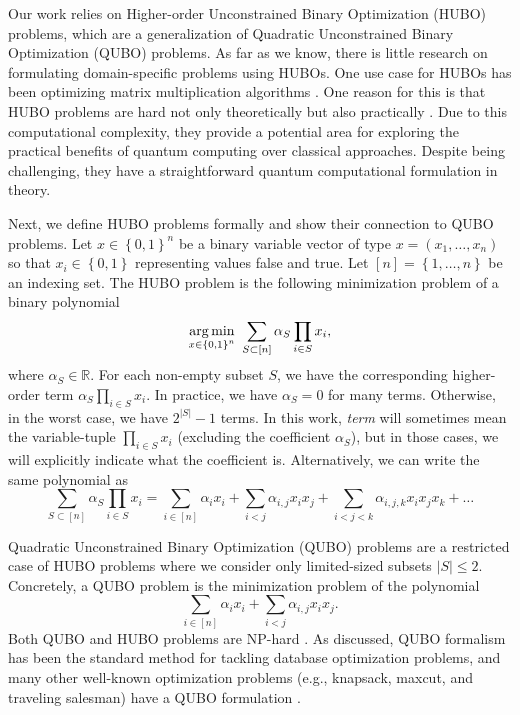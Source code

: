 Our work relies on Higher-order Unconstrained Binary Optimization (HUBO) \cite{boros_2002} problems, which are a generalization of Quadratic Unconstrained Binary Optimization (QUBO) problems. As far as we know, there is little research on formulating domain-specific problems using HUBOs. One use case for HUBOs has been optimizing matrix multiplication algorithms \cite{uotila2024tensordecompositionsadiabaticquantum}. One reason for this is that HUBO problems are hard not only theoretically but also practically \cite{boros_2002}. Due to this computational complexity, they provide a potential area for exploring the practical benefits of quantum computing over classical approaches. Despite being challenging, they have a straightforward quantum computational formulation \cite{10313783} in theory.

Next, we define HUBO problems \cite{boros_2002} formally and show their connection to QUBO problems. Let $x \in \left\{0, 1 \right\}^{n}$ be a binary variable vector of type $x = (x_1, \ldots, x_n)$ so that $x_i \in \left\{ 0, 1 \right\}$ representing values false and true. Let $[n] = \left\{1, \ldots, n \right\}$ be an indexing set. The HUBO problem is the following minimization problem of a binary polynomial
\begin{equation}\label{eq:hubo}
    \operatorname*{arg\,min}_{x \in \left\{0, 1 \right\}^{n}} \ \sum_{S \subset [n]}\alpha_{S}\prod_{i \in S}x_i,
\end{equation}
where $\alpha_{S} \in \mathds{R}$. For each non-empty subset $S$, we have the corresponding higher-order term $\alpha_{S}\prod_{i \in S}x_i$. In practice, we have $\alpha_{S} = 0$ for many terms. Otherwise, in the worst case, we have $2^{|S|} - 1$ terms. In this work, \textit{term} will sometimes mean the variable-tuple $\prod_{i \in S}x_i$ (excluding the coefficient $\alpha_{S}$), but in those cases, we will explicitly indicate what the coefficient is. Alternatively, we can write the same polynomial as
\begin{equation}\label{def:hubo_open}
    \sum_{S \subset [n]}\alpha_{S}\prod_{i \in S}x_i = \sum_{i \in [n]}\alpha_i x_i + \sum_{i < j}\alpha_{i,j}x_ix_j + \sum_{i < j < k}\alpha_{i,j,k}x_ix_jx_k + \ldots
\end{equation}

Quadratic Unconstrained Binary Optimization (QUBO) problems are a restricted case of HUBO problems where we consider only limited-sized subsets $|S| \leq 2$. Concretely, a QUBO problem is the minimization problem of the polynomial
\begin{equation}\label{def:qubo}
    \sum_{i \in [n]}\alpha_i x_i + \sum_{i < j}\alpha_{i,j}x_ix_j.
\end{equation}
Both QUBO and HUBO problems are NP-hard \cite{lucas_2014, boros_2002}. As discussed, QUBO formalism has been the standard method for tackling database optimization problems, and many other well-known optimization problems (e.g., knapsack, maxcut, and traveling salesman) have a QUBO formulation \cite{lucas_2014}.


